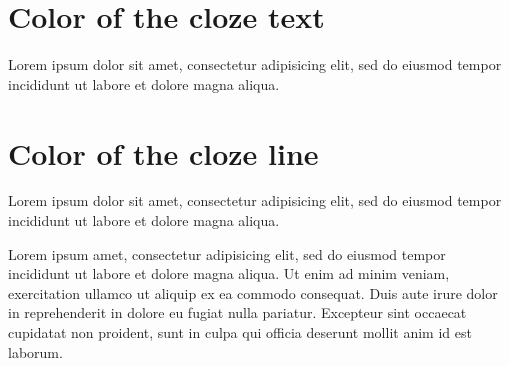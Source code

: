 \documentclass{article}
\begin{document}
\section{Color of the cloze text}


\textcolor{clozetextcolor}{Lorem ipsum dolor sit amet, consectetur
adipisicing elit, sed do eiusmod tempor incididunt ut labore et dolore
magna aliqua.}

\section{Color of the cloze line}


\textcolor{clozelinecolor}{Lorem ipsum dolor sit amet, consectetur
adipisicing elit, sed do eiusmod tempor incididunt ut labore et dolore
magna aliqua.}

\vspace{3cm}

Lorem ipsum  amet, consectetur adipisicing elit, sed do
eiusmod tempor incididunt ut labore et dolore magna aliqua. Ut enim ad
minim veniam,  exercitation ullamco  ut aliquip ex ea commodo consequat. Duis aute irure dolor in
reprehenderit in  dolore eu fugiat
nulla pariatur. Excepteur sint occaecat cupidatat non proident, sunt in
culpa qui officia deserunt mollit anim id est laborum.
\end{document}
